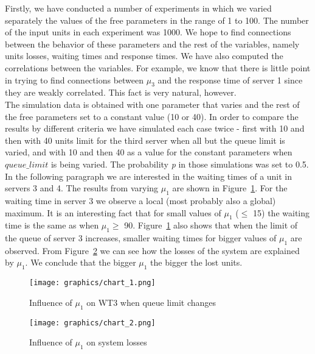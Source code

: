 \documentclass[12pt]{article}
\theoremstyle{plain}
\begin{document}
Firstly, we have conducted a number of experiments in which we varied separately the values of
the free parameters in the range of 1 to 100. The number of the input units in
each experiment was 1000. We hope to find connections between the behavior of
these parameters and the rest of the variables, namely units losses, waiting times
and response times. We have also computed the correlations between the variables.
For example, we know that there is little point in trying to find connections
between $\mu_3$ and the response time of server 1 since they are weakly correlated.
This fact is very natural, however.\\
The simulation data is obtained with one parameter that varies and the rest of
the free parameters set to a constant value (10 or 40). In order to compare the results by
different criteria we have simulated each case twice - first with 10 and then with 40
units limit for the third server when all but the queue limit is varied, and with
10 and then 40 as a value for the constant parameters when $queue\_limit$ is
being varied. The probability \emph{p} in those simulations was set to 0.5.\\
In the following paragraph we are interested in the waiting times of a unit in servers 3 and 4. The results
from varying $\mu_1$ are shown in Figure~\ref{fig:influence_of_mu1_on_wt3_when_queue_limit_changes}. For the waiting time in
server 3 we observe a local (most probably also a global) maximum. It is an interesting
fact that for small values of $\mu_1$ ($\le$ 15) the waiting time is the same as when
$\mu_1 \ge$ 90. Figure~\ref{fig:influence_of_mu1_on_wt3_when_queue_limit_changes} also shows that when the limit of the queue of
server 3 increases, smaller waiting times for bigger values of $\mu_1$ are
observed. From Figure~\ref{fig:influence_of_mu1_on_system:losses} we can see how the losses of the system are
explained by $\mu_1$. We conclude that the bigger $\mu_1$ the bigger the lost
units.

\begin{figure}
  \caption{Influence of $\mu_1$ on WT3 when queue limit changes}
  \texttt{[image: graphics/chart\_1.png]}\\
  \label{fig:influence_of_mu1_on_wt3_when_queue_limit_changes}
\end{figure}
\begin{figure}
  \caption{Influence of $\mu_1$ on system losses}
  \texttt{[image: graphics/chart\_2.png]}\\
  \label{fig:influence_of_mu1_on_system:losses}
\end{figure}
\end{document}
